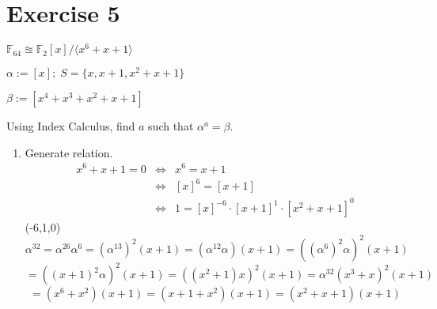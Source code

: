 \documentclass[a4paper]{scrreprt}
\newcommand\F{\mathbb F}
\begin{document}
\section*{Exercise 5}

$\F_{64} \approxeq \F_2[x]/\langle x^6+x+1\rangle$

$\alpha:=[x];\;S=\{x, x+1, x^2+x+1\}$

$\beta:=[x^4+x^3+x^2+x+1]$

Using Index Calculus, find $a$ such that $\alpha^a=\beta$.

\begin{enumerate}
    \item Generate relation.
        \begin{eqnarray*}
            x^6+x+1=0&\Leftrightarrow&x^6=x+1\\
                     &\Leftrightarrow& [x]^6=[x+1]\\
                     &\Leftrightarrow& 1=[x]^{-6}\cdot[x+1]^1\cdot[x^2+x+1]^0
        \end{eqnarray*}
        (-6,1,0)
        \[\alpha^{32} = \alpha^{26}\alpha^6 = (\alpha^{13})^2(x+1)
        = (\alpha^{12}\alpha)(x+1)=((\alpha^6)^2\alpha)^2(x+1)\]
        \[=((x+1)^2\alpha)^2(x+1) = ((x^2+1)x)^2(x+1)
        =\alpha^{32}(x^3+x)^2(x+1)\]
        \[=(x^6+x^2)(x+1)=(x+1+x^2)(x+1)=(x^2+x+1)(x+1)\]


\end{enumerate}
\end{document}
